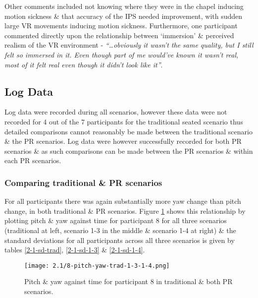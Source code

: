 Other comments included not knowing where they were in the chapel inducing motion sickness \& that accuracy of the IPS needed improvement, with sudden large VR movements inducing motion sickness. Furthermore, one participant commented directly upon the relationship between `immersion' \& perceived realism of the VR environment - \textit{``\ldots obviously it wasn't the same quality, but I still felt so immersed in it. Even though part of me would've known it wasn't real, most of it felt real even though it didn't look like it''}.


\subsection{Log Data}
\label{2-1-log-data}

Log data were recorded during all scenarios, however these data were not recorded for 4 out of the 7 participants for the traditional seated scenario thus detailed comparisons cannot reasonably be made between the traditional scenario \& the PR scenarios. Log data were however successfully recorded for both PR scenarios \& as such comparisons can be made between the PR scenarios \& within each PR scenarios.


\subsubsection{Comparing traditional \& PR scenarios}

For all participants there was again substantially more yaw change than pitch change, in both traditional \& PR scenarios. Figure \ref{2-1-8-pitch-yaw-trad-1-3-1-4.png} shows this relationship by plotting pitch \& yaw against time for participant 8 for all three scenarios (traditional at left, scenario 1-3 in the middle \& scenario 1-4 at right) \& the standard deviations for all participants across all three scenarios is given by tables \ref{2-1-sd-trad}, \ref{2-1-sd-1-3} \& \ref{2-1-sd-1-4}.

\begin{figure}[h]
	\begin{center}
	\texttt{[image: 2.1/8-pitch-yaw-trad-1-3-1-4.png]}
	\caption{Pitch \& yaw against time for participant 8 in traditional \& both PR scenarios.}
	\label{2-1-8-pitch-yaw-trad-1-3-1-4.png}
	\end{center}
\end{figure}

